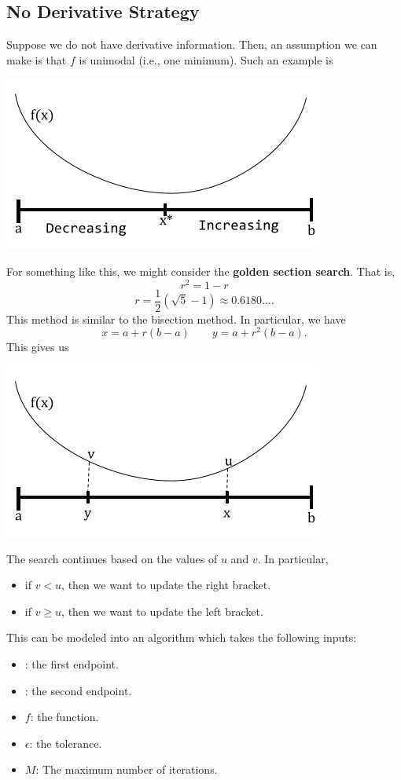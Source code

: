 \documentclass[letterpaper]{article}
\begin{document}
\subsection{No Derivative Strategy}
Suppose we do not have derivative information. Then, an assumption we can make is that $f$ is unimodal (i.e., one minimum). Such an example is 
\begin{center}
    \includegraphics[scale=0.5]{../assets/no_deriv_fx.png}
\end{center}
For something like this, we might consider the \textbf{golden section search}. That is, 
\[r^2 = 1 - r\]
\[r = \frac{1}{2} \left(\sqrt{5} - 1\right) \approx 0.6180\hdots.\]
This method is similar to the bisection method. In particular, we have 
\[x = a + r(b - a) \qquad y = a + r^2 (b - a).\]
This gives us 
\begin{center}
    \includegraphics[scale=0.5]{../assets/no_deriv_fx1.png}
\end{center}
The search continues based on the values of $u$ and $v$. In particular, 
\begin{itemize}
    \item if $v < u$, then we want to update the right bracket.
    \item if $v \geq u$, then we want to update the left bracket.
\end{itemize}
This can be modeled into an algorithm which takes the following inputs: 
\begin{itemize}
    \item {}: the first endpoint. 
    \item {}: the second endpoint. 
    \item $f$: the function. 
    \item $\epsilon$: the tolerance.
    \item $M$: The maximum number of iterations.
\end{itemize}
\end{document}
